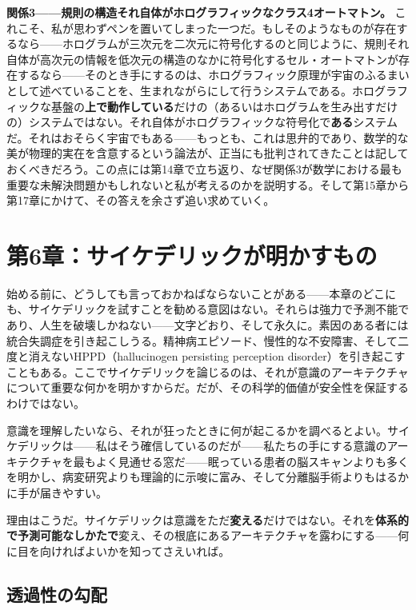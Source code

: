 \documentclass[11pt, twoside, openright]{book}
\begin{document}
\textbf{関係3------規則の構造それ自体がホログラフィックなクラス4オートマトン。} これこそ、私が思わずペンを置いてしまった一つだ。もしそのようなものが存在するなら------ホログラムが三次元を二次元に符号化するのと同じように、規則それ自体が高次元の情報を低次元の構造のなかに符号化するセル・オートマトンが存在するなら------そのとき手にするのは、ホログラフィック原理が宇宙のふるまいとして述べていることを、生まれながらにして行うシステムである。ホログラフィックな基盤の\textbf{上で動作している}だけの（あるいはホログラムを生み出すだけの）システムではない。それ自体がホログラフィックな符号化で\textbf{ある}システムだ。それはおそらく宇宙でもある------もっとも、これは思弁的であり、数学的な美が物理的実在を含意するという論法が、正当にも批判されてきたことは記しておくべきだろう。この点には第14章で立ち返り、なぜ関係3が数学における最も重要な未解決問題かもしれないと私が考えるのかを説明する。そして第15章から第17章にかけて、その答えを余さず追い求めていく。


\chapter*{第6章：サイケデリックが明かすもの}

始める前に、どうしても言っておかねばならないことがある------本章のどこにも、サイケデリックを試すことを勧める意図はない。それらは強力で予測不能であり、人生を破壊しかねない------文字どおり、そして永久に。素因のある者には統合失調症を引き起こしうる。精神病エピソード、慢性的な不安障害、そして二度と消えないHPPD（hallucinogen persisting perception disorder）を引き起こすこともある。ここでサイケデリックを論じるのは、それが意識のアーキテクチャについて重要な何かを明かすからだ。だが、その科学的価値が安全性を保証するわけではない。

意識を理解したいなら、それが狂ったときに何が起こるかを調べるとよい。サイケデリックは------私はそう確信しているのだが------私たちの手にする意識のアーキテクチャを最もよく見通せる窓だ------眠っている患者の脳スキャンよりも多くを明かし、病変研究よりも理論的に示唆に富み、そして分離脳手術よりもはるかに手が届きやすい。

理由はこうだ。サイケデリックは意識をただ\textbf{変える}だけではない。それを\textbf{体系的で予測可能なしかたで}変え、その根底にあるアーキテクチャを露わにする------何に目を向ければよいかを知ってさえいれば。

\section*{透過性の勾配}
\end{document}
